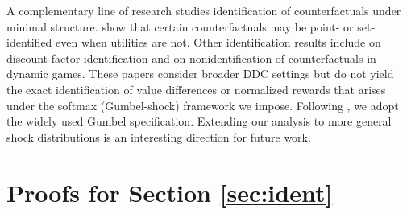 \documentclass[11pt]{article}
\theoremstyle{plain}
\begin{document}
A complementary line of research studies identification of counterfactuals under
minimal structure. \citet{kalouptsidi2021identification} show that certain
counterfactuals may be point- or set-identified even when utilities are not.
Other identification results include \citet{abbring2020identifying} on
discount-factor identification and \citet{kalouptsidi2017non} on
nonidentification of counterfactuals in dynamic games. These papers consider
broader DDC settings but do not yield the exact identification of value
differences or normalized rewards that arises under the softmax (Gumbel-shock)
framework we impose. Following \citet{rust1987optimal}, we adopt the widely used Gumbel
specification. Extending our analysis to more general shock distributions is an
interesting direction for future work.


 




 

\section{Proofs for Section \ref{sec:ident}}

 
 
\end{document}
